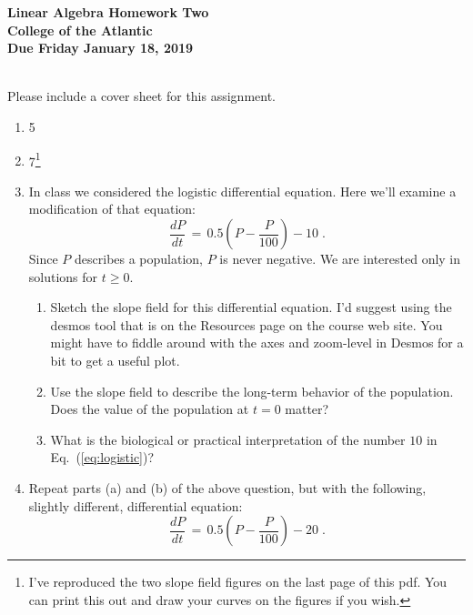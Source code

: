 \documentclass[11pt]{article}
\begin{document}
\pagestyle{empty}
 
\begin{center}
{\Large {\bf Linear Algebra Homework Two}}\\
\medskip
{\large {\bf College of the Atlantic}}\\
\medskip
{\large {\bf Due Friday January 18, 2019}}\\
\medskip
\end{center}

\\


\noindent Please include a cover sheet for this assignment.\\

\begin{enumerate}
\setlength{\itemsep}{-1mm}
  \item 5 
  \item 7\footnote{I've reproduced the two slope field figures on the
    last page of this pdf.  You can print this out and draw your
    curves on the figures if you wish.}
  \item In class we considered the logistic differential equation.
    Here we'll examine a modification of that equation:
    \begin{equation}
      \frac{dP}{dt} \, = \, 0.5(P - \frac{P}{100}) - 10 \;.
      \label{eq:logistic}  
    \end{equation}
    Since $P$ describes a population, $P$ is never negative.  We are
    interested only in solutions for $ t \geq 0$.  
    \begin{enumerate}
      \item Sketch the slope field for this differential equation.
        I'd suggest using the desmos tool that is on the Resources
        page on the course web site.  You might have to fiddle around
        with the axes and zoom-level in Desmos for a bit to get a
        useful plot.
      \item Use the slope field to describe the long-term behavior of
        the population.  Does the value of the population at $t=0$
        matter?
        \item What is the biological or practical interpretation of the
          number $10$ in Eq.~(\ref{eq:logistic})?
    \end{enumerate}
    
\item Repeat parts (a) and (b) of the above question, but with the
  following, slightly different, differential equation:
  \begin{equation}
    \frac{dP}{dt} \, = \, 0.5(P - \frac{P}{100}) - 20 \;.
    \label{eq:logistic2}  
  \end{equation}
\end{enumerate}
\end{document}
